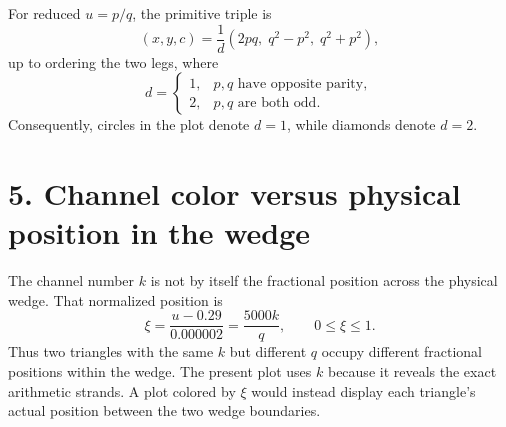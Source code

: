 \documentclass[11pt]{article}
\begin{document}
For reduced $u=p/q$, the primitive triple is
\[
  (x,y,c)=\frac{1}{d}\left(2pq,\;q^2-p^2,\;q^2+p^2\right),
\]
up to ordering the two legs, where
\[
  d=\begin{cases}
      1, & p,q\text{ have opposite parity},\\
      2, & p,q\text{ are both odd}.
    \end{cases}
\]
Consequently, circles in the plot denote $d=1$, while diamonds denote $d=2$.

\section*{5. Channel color versus physical position in the wedge}

The channel number $k$ is not by itself the fractional position across the
physical wedge.  That normalized position is
\[
  \boxed{
  \xi=\frac{u-0.29}{0.000002}=\frac{5000k}{q},
  \qquad 0\leq\xi\leq1.
  }
\]
Thus two triangles with the same $k$ but different $q$ occupy different
fractional positions within the wedge.  The present plot uses $k$ because it
reveals the exact arithmetic strands.  A plot colored by $\xi$ would instead
display each triangle's actual position between the two wedge boundaries.
\end{document}
